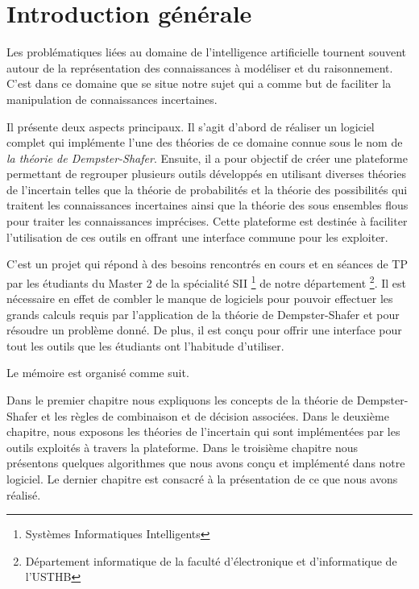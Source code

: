 {}
\chapter*{Introduction générale}
Les problématiques liées au domaine de l'intelligence artificielle tournent souvent autour de la représentation
des connaissances à modéliser et du raisonnement. C'est dans ce domaine que se situe notre sujet qui a comme but
de faciliter la manipulation de connaissances incertaines.

Il présente deux aspects principaux. Il s'agit d'abord de réaliser un logiciel complet qui implémente l'une des
théories de ce domaine connue sous le nom de \emph{la théorie de Dempster-Shafer}. Ensuite, il a pour objectif de
créer une plateforme permettant de regrouper plusieurs outils développés en utilisant diverses théories de l'incertain
telles que la théorie de probabilités et la théorie des possibilités qui traitent les connaissances incertaines ainsi
que la théorie des sous ensembles flous pour traiter les connaissances imprécises. Cette plateforme est destinée à
faciliter l'utilisation de ces outils en offrant une interface commune pour les exploiter.

C'est un projet qui répond à des besoins rencontrés en cours et en séances de TP par les étudiants du Master 2 de la
spécialité SII \footnote{Systèmes Informatiques Intelligents} de notre département \footnote{Département informatique
de la faculté d'électronique et d'informatique de l'USTHB}. Il est nécessaire en effet de combler le manque de logiciels
pour pouvoir effectuer les grands calculs requis par l'application de la théorie de Dempster-Shafer et pour résoudre un
problème donné. De plus, il est conçu pour offrir une interface pour tout les outils que les étudiants ont l'habitude
d'utiliser.

Le mémoire est organisé comme suit.

Dans le premier chapitre nous expliquons les concepts de la théorie de Dempster-Shafer et les règles de combinaison
et de décision associées. Dans le deuxième chapitre, nous exposons les théories de l'incertain qui sont implémentées
par les outils exploités à travers la plateforme. Dans le troisième chapitre nous présentons quelques algorithmes que
nous avons conçu et implémenté dans notre logiciel. Le dernier chapitre est consacré à la présentation de ce que
nous avons réalisé.